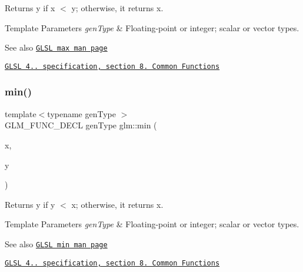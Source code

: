 Returns y if x $<$ y; otherwise, it returns x.


\begin{DoxyTemplParams}{Template Parameters}
{\em gen\+Type} & Floating-\/point or integer; scalar or vector types.\\
\hline
\end{DoxyTemplParams}
\begin{DoxySeeAlso}{See also}
\href{http://www.opengl.org/sdk/docs/manglsl/xhtml/max.xml}{\tt G\+L\+SL max man page} 

\href{http://www.opengl.org/registry/doc/GLSLangSpec.4.20.8.pdf}{\tt G\+L\+SL 4.. specification, section 8. Common Functions} 
\end{DoxySeeAlso}
\mbox{\label{group__core__func__common_ga2c2bde1cec025b7ddff83c74a1113719}} 
\subsubsection{\texorpdfstring{min()}{min()}}
{\footnotesize\ttfamily template$<$typename gen\+Type $>$ \\
G\+L\+M\+\_\+\+F\+U\+N\+C\+\_\+\+D\+E\+CL gen\+Type glm\+::min (\begin{DoxyParamCaption}\item[{gen\+Type}]{x,  }\item[{gen\+Type}]{y }\end{DoxyParamCaption})}

Returns y if y $<$ x; otherwise, it returns x.


\begin{DoxyTemplParams}{Template Parameters}
{\em gen\+Type} & Floating-\/point or integer; scalar or vector types.\\
\hline
\end{DoxyTemplParams}
\begin{DoxySeeAlso}{See also}
\href{http://www.opengl.org/sdk/docs/manglsl/xhtml/min.xml}{\tt G\+L\+SL min man page} 

\href{http://www.opengl.org/registry/doc/GLSLangSpec.4.20.8.pdf}{\tt G\+L\+SL 4.. specification, section 8. Common Functions} 
\end{DoxySeeAlso}
\mbox{\label{group__core__func__common_gadccbaffe46f369cf1a96b2aef92cbfdd}} 
